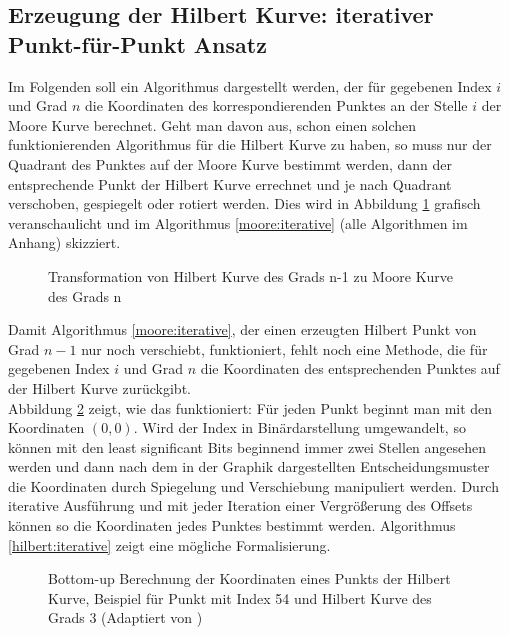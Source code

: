 \documentclass[course=erap]{aspdoc}
\begin{document}
\subsection{Erzeugung der Hilbert Kurve: iterativer Punkt-für-Punkt Ansatz}
Im Folgenden soll ein Algorithmus dargestellt werden, der für gegebenen Index $i$ und Grad $n$ die Koordinaten des korrespondierenden Punktes an der Stelle $i$ der Moore Kurve berechnet.
Geht man davon aus, schon einen solchen funktionierenden Algorithmus für die Hilbert Kurve zu haben, so muss nur der Quadrant des Punktes auf der Moore Kurve bestimmt werden, dann der entsprechende Punkt der Hilbert Kurve errechnet und je nach Quadrant verschoben, gespiegelt oder rotiert werden. Dies wird in Abbildung \ref{HilbertZuMoore} grafisch veranschaulicht und im Algorithmus \ref{moore:iterative} (alle Algorithmen im Anhang) skizziert.
\begin{figure}[h]
\centering
\def\svgwidth{240pt}

\caption{Transformation von Hilbert Kurve des Grads n-1 zu Moore Kurve des Grads n}
\label{HilbertZuMoore}
\end{figure}
Damit Algorithmus \ref{moore:iterative}, der einen erzeugten Hilbert Punkt von Grad $n-1$ nur noch verschiebt, funktioniert, fehlt noch eine Methode, die für gegebenen Index $i$ und Grad $n$ die Koordinaten des entsprechenden Punktes auf der Hilbert Kurve zurückgibt. \\
Abbildung \ref{fig:hilbertBuildup} zeigt, wie das funktioniert: Für jeden Punkt beginnt man mit den Koordinaten $(0, 0)$. Wird der Index in Binärdarstellung umgewandelt, so können mit den least significant Bits beginnend immer zwei Stellen angesehen werden und dann nach dem in der Graphik dargestellten Entscheidungsmuster die Koordinaten durch Spiegelung und Verschiebung manipuliert werden. Durch iterative Ausführung und mit jeder Iteration einer Vergrößerung des Offsets können so die Koordinaten jedes Punktes bestimmt werden. \cite{Chwedzuk2016} Algorithmus \ref{hilbert:iterative} zeigt eine mögliche Formalisierung.

\begin{figure}[h]
    \centering
    \caption{Bottom-up Berechnung der Koordinaten eines Punkts der Hilbert Kurve, Beispiel für Punkt mit Index 54 und Hilbert Kurve des Grads 3 (Adaptiert von \cite{Chwedzuk2016})}%
    \label{fig:hilbertBuildup}%
\end{figure}
\end{document}
